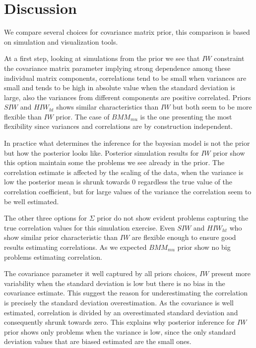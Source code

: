 \documentclass{article}
\begin{document}
\section{Discussion} 

We compare several choices for covariance matrix prior, this comparison is based on simulation and visualization tools. 

At a first step, looking at simulations from the prior we see that $IW$ constraint the covariance matrix parameter implying strong dependence among these individual matrix components, correlations tend to be small when variances are small and tends to be high in absolute value when the standard deviation is large, also the variances from different components are positive correlated.  Priors $SIW$ and $HIW_{ht}$ shows similar characteristics than $IW$ but both seem to be more flexible than $IW$ prior. The case of $BMM_{mu}$ is the one presenting the most flexibility since variances and correlations are by construction independent.

In practice what determines the inference for the bayesian model is not the prior but how the posterior looks like. Posterior simulation results for $IW$ prior show this option maintain some the problems we see already in the prior.  The correlation estimate is affected by the scaling of the data, when the variance is low the posterior mean is shrunk towards 0 regardless the true value of the correlation coefficient, but for large values of the variance the correlation seem to be well estimated.  

The other three options for $\Sigma$ prior do not show evident problems capturing the true correlation values for this simulation exercise. Even  $SIW$ and $HIW_{ht}$ who show similar prior characteristic than $IW$ are flexible enough to ensure good results estimating correlations. As we expected $BMM_{mu}$ prior show no big problems estimating  correlation. 

The covariance parameter it well captured by all priors choices, $IW$ present more variability when the standard deviation is low but there is no bias in the covariance estimate. This suggest the reason for underestimating the correlation is precisely the standard deviation overestimation. As the covariance is well estimated, correlation is divided by an overestimated standard deviation and consequently shrunk towards zero. This explains why posterior inference for $IW$ prior shows only problems when the variance is low, since the only standard deviation values that are biased estimated are the small ones. 
\end{document}
